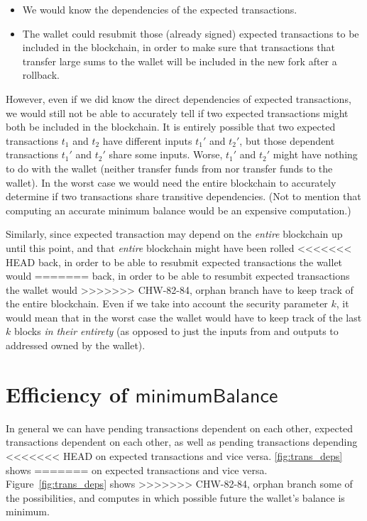 \documentclass{article}
\theoremstyle{definition}{
  \newtheorem{lemma}{Lemma}[section] %
  \newtheorem{definition}[lemma]{Definition}
}
\theoremstyle{theorem}{
  \newtheorem{invariant}[lemma]{Invariant}
  \newtheorem{proofobligation}[lemma]{Proof Obligation}
}
\numberwithin{equation}{lemma}
\begin{document}
\begin{itemize}
\item We would know the dependencies of the expected transactions.
\item The wallet could resubmit those (already signed) expected transactions to
be included in the blockchain, in order to make sure that transactions that
transfer large sums to the wallet will be included in the new fork after a
rollback.
\end{itemize}

However, even if we did know the direct dependencies of expected transactions,
we would still not be able to accurately tell if two expected transactions might
both be included in the blockchain. It is entirely possible that two expected
transactions $t_1$ and $t_2$ have different inputs $t_1'$ and $t_2'$, but those
dependent transactions $t_1'$ and $t_2'$ share some inputs. Worse, $t_1'$ and
$t_2'$ might have nothing to do with the wallet (neither transfer funds from nor
transfer funds to the wallet). In the worst case we would need the entire
blockchain to  accurately determine if two transactions share transitive
dependencies. (Not to mention that computing an accurate minimum balance
would be an expensive computation.)

Similarly, since expected transaction may depend on the \emph{entire} blockchain
up until this point, and that \emph{entire} blockchain might have been rolled
<<<<<<< HEAD
back, in order to be able to resubmit expected transactions the wallet would
=======
back, in order to be able to resumbit expected transactions the wallet would
>>>>>>> CHW-82-84, orphan branch
have to keep track of the entire blockchain. Even if we take into account the
security parameter $k$, it would mean that in the worst case the wallet would
have to keep track of the last $k$ blocks \emph{in their entirety} (as opposed
to just the inputs from and outputs to addressed owned by the wallet).

\section{Efficiency of $\mathsf{minimumBalance}$}
\label{sec:computing_minimum_balance}

In general we can have pending transactions dependent on each other, expected
transactions dependent on each other, as well as pending transactions depending
<<<<<<< HEAD
on expected transactions and vice versa. \cref{fig:trans_deps} shows
=======
on expected transactions and vice versa. Figure~\ref{fig:trans_deps} shows
>>>>>>> CHW-82-84, orphan branch
some of the possibilities, and computes in which possible future the wallet's
balance is minimum.
\end{document}
